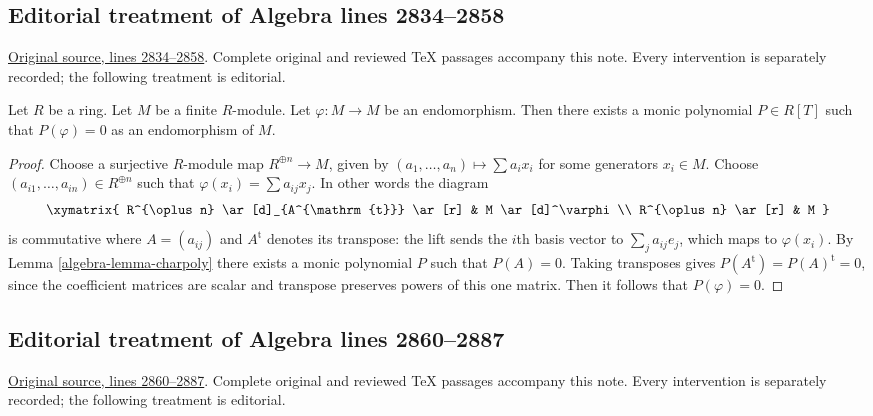\subsection{Editorial treatment of Algebra lines 2834--2858}

\hypertarget{algebra-context-009}{}

\noindent\href{https://github.com/stacks/stacks-project/blob/a04446e57ec1fbc252a871afcec7752fb2807b14/algebra.tex\#L2834}{Original source, lines 2834--2858}. Complete original and reviewed TeX passages accompany this note. Every intervention is separately recorded; the following treatment is editorial.


\begin{lemma}
\label{editorial-source-lemma-charpoly-module}
Let $R$ be a ring.
Let $M$ be a finite $R$-module.
Let $\varphi : M \to M$ be an endomorphism.
Then there exists a monic polynomial $P \in R[T]$ such that
$P(\varphi) = 0$ as an endomorphism of $M$.
\end{lemma}

\begin{proof}
Choose a surjective $R$-module map $R^{\oplus n} \to M$, given by
$(a_1, \ldots, a_n) \mapsto \sum a_ix_i$ for some generators $x_i \in M$.
Choose $(a_{i1}, \ldots, a_{in}) \in R^{\oplus n}$ such that
$\varphi(x_i) = \sum a_{ij} x_j$. In other words the diagram
$$
\xymatrix{
R^{\oplus n} \ar[d]_{A^{\mathrm{t}}} \ar[r] & M \ar[d]^\varphi \\
R^{\oplus n} \ar[r] & M
}
$$
is commutative where $A = (a_{ij})$ and $A^{\mathrm{t}}$
denotes its transpose: the lift sends the $i$th basis vector to
$\sum_j a_{ij}e_j$, which maps to $\varphi(x_i)$.
By
Lemma \ref{algebra-lemma-charpoly}
there exists a monic polynomial $P$ such that $P(A) = 0$.
Taking transposes gives $P(A^{\mathrm{t}})=P(A)^{\mathrm{t}}=0$,
since the coefficient matrices are scalar and transpose preserves
powers of this one matrix.
Then it follows that $P(\varphi) = 0$.
\end{proof}


\subsection{Editorial treatment of Algebra lines 2860--2887}

\hypertarget{algebra-context-010}{}

\noindent\href{https://github.com/stacks/stacks-project/blob/a04446e57ec1fbc252a871afcec7752fb2807b14/algebra.tex\#L2860}{Original source, lines 2860--2887}. Complete original and reviewed TeX passages accompany this note. Every intervention is separately recorded; the following treatment is editorial.


